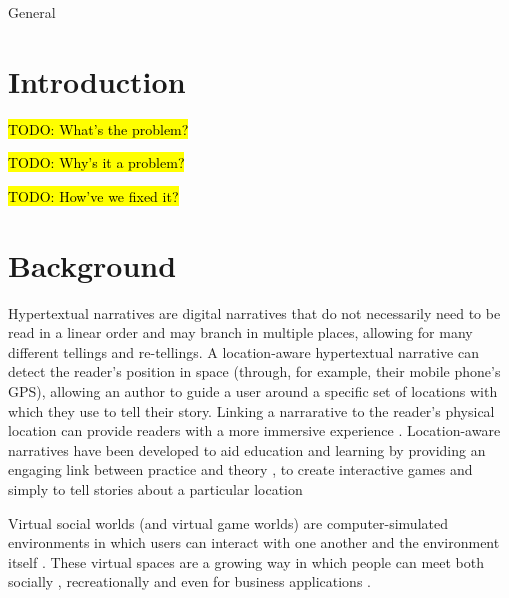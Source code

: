 \documentclass{acm}
\newcommand{\TODO}[1]{\hl{TODO: #1}}
\begin{document}
\copyrightetc{\the\acmcopyr}

\maketitle
\begin{abstract}
\TODO{ABSTRACT}
\end{abstract}

 General


\section{Introduction}
\TODO{What's the problem?}

\TODO{Why's it a problem?}

\TODO{How've we fixed it?}


\section{Background}
Hypertextual narratives are digital narratives that do not necessarily need to be read in a linear order and may branch in multiple places, allowing for many different tellings and re-tellings. A location-aware hypertextual narrative can detect the reader's position in space (through, for example, their mobile phone's GPS), allowing an author to guide a user around a specific set of locations with which they use to tell their story. Linking a narrarative to the reader's physical location can provide readers with a more immersive experience \cite{karapanos2012does}. Location-aware narratives have been developed to aid education and learning by providing an engaging link between practice and theory \cite{ardito2007mobile, rogers2005ubi}, to create interactive games \cite{benford2003coping, bunting2012player} and simply to tell stories about a particular location \cite{dionisio2010iland, pittarello2011designing}

Virtual social worlds (and virtual game worlds) are computer-simulated environments in which users can interact with one another and the environment itself \cite{Kaplan2010}. These virtual spaces are a growing way in which people can meet both socially \cite{kaplan2009fairyland}, recreationally \cite{wu2008they} and even for business applications \cite{erickson2011synchronous}. 
\end{document}
